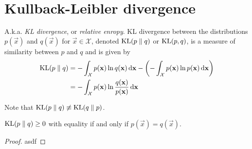 \section{Kullback-Leibler divergence}
A.k.a. \emph{KL divergence}, or \emph{relative enropy}. KL divergence between the distributions $p(\vec x)$ and $q(\vec x)$ for $\vec x \in \mathcal X$, denoted $\operatorname{KL}(p \parallel q)$ or $\operatorname{KL}(p, q)$, is a measure of similarity between $p$ and $q$ and is given by
\begin{align}
    \operatorname{KL}(p \parallel q)  &= -\int_{\mathcal X} p(\boldsymbol{\mathbf{x}}) \ln q(\boldsymbol{\mathbf{x}}) \,\mathrm d\boldsymbol{\mathbf{x}} - \left(-\int_{\mathcal X} p(\boldsymbol{\mathbf{x}}) \ln p(\boldsymbol{\mathbf{x}}) \,\mathrm d\boldsymbol{\mathbf{x}}\right) \nonumber\\
                        &= -\int_{\mathcal X} p(\boldsymbol{\mathbf{x}}) \ln \frac{q(\boldsymbol{\mathbf{x}})}{p(\boldsymbol{\mathbf{x}})} \,\mathrm d\boldsymbol{\mathbf{x}}
\end{align}

Note that $\operatorname{KL}(p \parallel q) \not\equiv \operatorname{KL}(q \parallel p)$.

\begin{claim}
    $\operatorname{KL}(p \parallel q) \geq 0$ with equality if and only if $p(\vec x) = q(\vec x)$.
\end{claim}

\begin{proof}
    asdf
\end{proof}